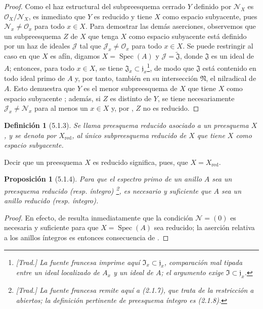 \documentclass[oneside]{amsart}
\theoremstyle{ega-env-style}
\theoremstyle{ega-thm-env-style}
\newtheorem*{proposition}{Proposición}
\theoremstyle{ega-defn-env-style}
\newtheorem*{definition}{Definición}
\let\EGAOriginalLabel\label
\renewcommand{\label}[1]{\phantomsection\EGAOriginalLabel{#1}}
\begin{document}
\begin{proof}
Como el haz estructural del subpreesquema cerrado $Y$ definido por $\mathscr{N}_X$ es $\mathscr{O}_X/\mathscr{N}_X$, es inmediato que $Y$ es reducido y tiene $X$ como espacio subyacente, pues $\mathscr{N}_x\ne\mathscr{O}_x$ para todo $x\in X$.
Para demostrar las demás aserciones, observemos que un subpreesquema $Z$ de $X$ que tenga $X$ como espacio subyacente está definido por un haz de ideales $\mathscr{J}$  tal que $\mathscr{J}_x\ne\mathscr{O}_x$ para todo $x\in X$.
Se puede restringir al caso en que $X$ es afín, digamos $X=\operatorname{Spec}(A)$ y $\mathscr{J}=\widetilde{\mathfrak{J}}$, donde $\mathfrak{J}$ es un ideal de $A$;
entonces, para todo $x\in X$, se tiene $\mathfrak{J}_x\subset\mathfrak{j}_x$\footnote{\emph{[Trad.] La fuente francesa imprime aquí $\mathfrak{I}_x\subset\mathfrak{j}_x$, comparación mal tipada entre un ideal localizado de $A_x$ y un ideal de $A$; el argumento exige $\mathfrak{I}\subset\mathfrak{j}_x$.}}, de modo que $\mathfrak{J}$ está contenido en todo ideal primo de $A$ y, por tanto, también en su intersección $\mathfrak{N}$, el nilradical de $A$.
Esto demuestra que $Y$ es el menor subpreesquema de $X$ que tiene $X$ como espacio subyacente ;
además, si $Z$ es distinto de $Y$, se tiene necesariamente $\mathscr{J}_x\ne\mathscr{N}_x$ para al menos un $x\in X$ y, por , $Z$ no es reducido.
\end{proof}

\begin{definition}[5.1.3]
\label{I.5.1.3}
Se llama preesquema reducido asociado a un preesquema $X$, y se denota por $X_{\mathrm{red}}$, al único subpreesquema reducido de $X$ que tiene $X$ como espacio subyacente.
\end{definition}

Decir que un preesquema $X$ es reducido significa, pues, que $X=X_{\mathrm{red}}$.

\begin{proposition}[5.1.4]
\label{I.5.1.4}
Para que el espectro primo de un anillo $A$ sea un preesquema reducido (\textup{resp.} íntegro) \footnote{\emph{[Trad.] La fuente francesa remite aquí a (2.1.7), que trata de la restricción a abiertos; la definición pertinente de preesquema íntegro es (2.1.8).}}, es necesario y suficiente que $A$ sea un anillo reducido (\textup{resp.} íntegro).
\end{proposition}

\begin{proof}
En efecto, de  resulta inmediatamente que la condición $\mathscr{N}=(0)$ es necesaria y suficiente para que $X=\operatorname{Spec}(A)$ sea reducido;
la aserción relativa a los anillos íntegros es entonces consecuencia de .
\end{proof}
\end{document}
